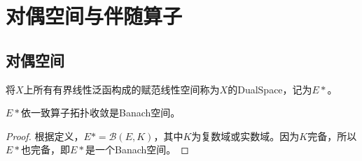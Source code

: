 \section{对偶空间与伴随算子}

\subsection{对偶空间}
\begin{definition}
	将$X$上所有有界线性泛函构成的赋范线性空间称为$X$的\gls{DualSpace}，记为$E*$。
\end{definition}
\begin{theorem}
	$E*$依一致算子拓扑收敛是Banach空间。
\end{theorem}
\begin{proof}
	根据定义，$E*=\mathscr{B}(E,K)$，其中$K$为复数域或实数域。因为$K$完备，所以$E*$也完备，即$E*$是一个Banach空间。
\end{proof}
